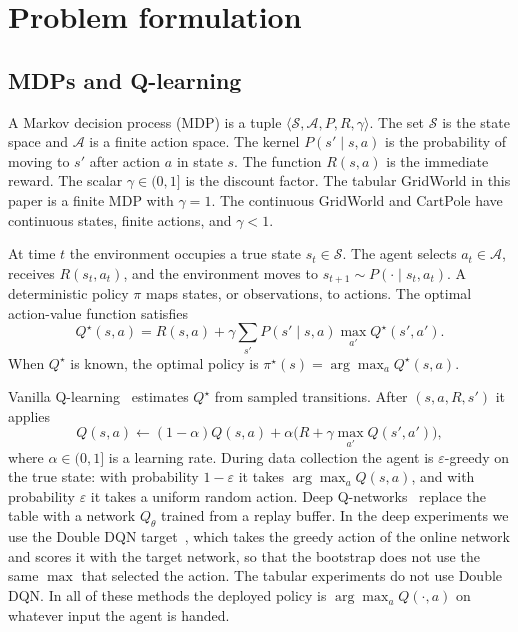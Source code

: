 \documentclass[10pt,twocolumn]{article}
\begin{document}
\section{Problem formulation}
\label{sec:bg}

\subsection{MDPs and Q-learning}
A Markov decision process (MDP) is a tuple $\langle \mathcal{S},\mathcal{A},P,R,\gamma\rangle$.
The set $\mathcal{S}$ is the state space and $\mathcal{A}$ is a finite action space.
The kernel $P(s'\mid s,a)$ is the probability of moving to $s'$ after action $a$ in state $s$.
The function $R(s,a)$ is the immediate reward.
The scalar $\gamma\in(0,1]$ is the discount factor.
The tabular GridWorld in this paper is a finite MDP with $\gamma=1$.
The continuous GridWorld and CartPole have continuous states, finite actions, and $\gamma<1$.

At time $t$ the environment occupies a true state $s_t\in\mathcal{S}$.
The agent selects $a_t\in\mathcal{A}$, receives $R(s_t,a_t)$, and the environment moves to $s_{t+1}\sim P(\cdot\mid s_t,a_t)$.
A deterministic policy $\pi$ maps states, or observations, to actions.
The optimal action-value function satisfies
\begin{equation}
Q^\star(s,a)=R(s,a)+\gamma\sum_{s'}P(s'\mid s,a)\max_{a'}Q^\star(s',a').
\label{eq:bellman}
\end{equation}
When $Q^\star$ is known, the optimal policy is $\pi^\star(s)=\arg\max_a Q^\star(s,a)$.

Vanilla Q-learning~\cite{watkins1992q} estimates $Q^\star$ from sampled transitions.
After $(s,a,R,s')$ it applies
\begin{equation}
Q(s,a)\leftarrow (1-\alpha)Q(s,a)+\alpha\bigl(R+\gamma\max_{a'}Q(s',a')\bigr),
\label{eq:vanilla-q}
\end{equation}
where $\alpha\in(0,1]$ is a learning rate.
During data collection the agent is $\varepsilon$-greedy on the true state: with probability $1-\varepsilon$ it takes $\arg\max_a Q(s,a)$, and with probability $\varepsilon$ it takes a uniform random action.
Deep Q-networks~\cite{mnih2015human} replace the table with a network $Q_\theta$ trained from a replay buffer.
In the deep experiments we use the Double DQN target~\cite{van2016deep}, which takes the greedy action of the online network and scores it with the target network, so that the bootstrap does not use the same $\max$ that selected the action.
The tabular experiments do not use Double DQN.
In all of these methods the deployed policy is $\arg\max_a Q(\cdot,a)$ on whatever input the agent is handed.
\end{document}
